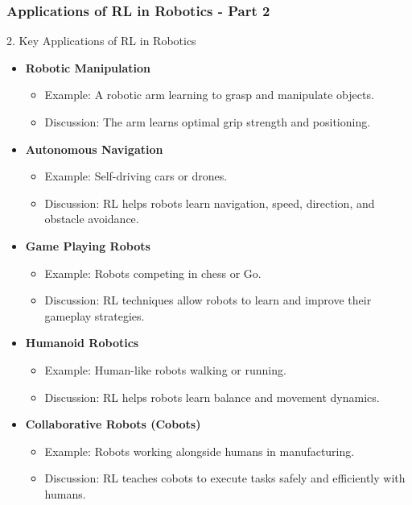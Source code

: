 \documentclass{beamer}
\begin{document}
\begin{frame}[fragile]
    \frametitle{Applications of RL in Robotics - Part 2}
    \begin{block}{2. Key Applications of RL in Robotics}
        \begin{itemize}
            \item \textbf{Robotic Manipulation}
            \begin{itemize}
                \item Example: A robotic arm learning to grasp and manipulate objects.
                \item Discussion: The arm learns optimal grip strength and positioning.
            \end{itemize}
            \item \textbf{Autonomous Navigation}
            \begin{itemize}
                \item Example: Self-driving cars or drones.
                \item Discussion: RL helps robots learn navigation, speed, direction, and obstacle avoidance.
            \end{itemize}
            \item \textbf{Game Playing Robots}
            \begin{itemize}
                \item Example: Robots competing in chess or Go.
                \item Discussion: RL techniques allow robots to learn and improve their gameplay strategies.
            \end{itemize}
            \item \textbf{Humanoid Robotics}
            \begin{itemize}
                \item Example: Human-like robots walking or running.
                \item Discussion: RL helps robots learn balance and movement dynamics.
            \end{itemize}
            \item \textbf{Collaborative Robots (Cobots)}
            \begin{itemize}
                \item Example: Robots working alongside humans in manufacturing.
                \item Discussion: RL teaches cobots to execute tasks safely and efficiently with humans.
            \end{itemize}
        \end{itemize}
    \end{block}
\end{frame}
\end{document}
